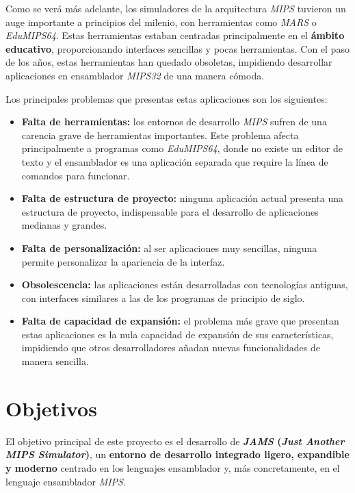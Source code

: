 Como se verá más adelante, los simuladores de la arquitectura \textit{MIPS} tuvieron
un auge importante a principios del milenio, con herramientas como \textit{MARS}\cite{MARS}
o \textit{EduMIPS64}\cite{EDUMIPS64}.
Estas herramientas estaban centradas principalmente en el \textbf{ámbito educativo}, proporcionando
interfaces sencillas y pocas herramientas.
Con el paso de los años, estas herramientas han quedado obsoletas, impidiendo desarrollar aplicaciones
en ensamblador \textit{MIPS32} de una manera cómoda.

\noindent Los principales problemas que presentas estas aplicaciones son los siguientes:
\begin{itemize}
    \item \textbf{Falta de herramientas:} los entornos de desarrollo \textit{MIPS} sufren de una
    carencia grave de herramientas importantes.
    Este problema afecta principalmente a programas como \textit{EduMIPS64}, donde no existe un editor de texto y
    el ensamblador es una aplicación separada que require la línea de comandos para funcionar.
    \item \textbf{Falta de estructura de proyecto:} ninguna aplicación actual presenta una estructura
    de proyecto, indispensable para el desarrollo de aplicaciones medianas y grandes.
    \item \textbf{Falta de personalización:} al ser aplicaciones muy sencillas, ninguna permite
    personalizar la apariencia de la interfaz.
    \item \textbf{Obsolescencia:} las aplicaciones están desarrolladas con tecnologías antiguas,
    con interfaces similares a las de los programas de principio de siglo.
    \item \textbf{Falta de capacidad de expansión:} el problema más grave que presentan estas aplicaciones
    es la nula capacidad de expansión de sus características, impidiendo que otros desarrolladores
    añadan nuevas funcionalidades de manera sencilla.
\end{itemize}


\section{Objetivos}\label{sec:objetivos}

El objetivo principal de este proyecto es el desarrollo de \textbf{\textit{JAMS}
(\textit{Just Another MIPS Simulator})}, un \textbf{entorno de desarrollo integrado ligero, expandible y moderno}
centrado en los lenguajes ensamblador y, más concretamente, en el lenguaje ensamblador \textit{MIPS}.

